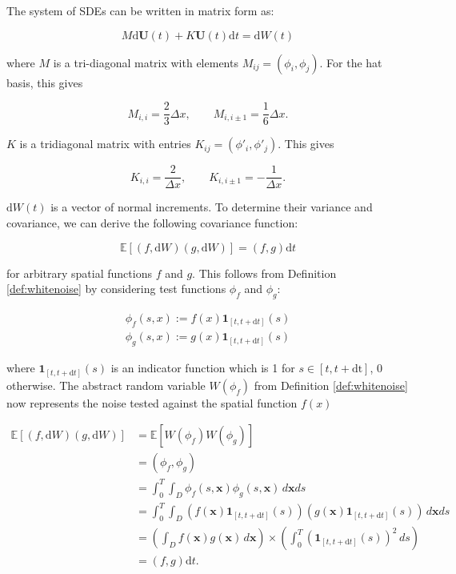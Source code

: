 The system of SDEs can be written in matrix form as:

\begin{equation}\label{eq:fe_sdes_system}
    M \mathrm{d}\mathbf{U}(t) + K \mathbf{U}(t)\mathrm{d}t = \mathrm{d}W(t)
\end{equation}

where $M$ is a tri-diagonal matrix with elements $M_{ij} = (\phi_i, \phi_j)$. 
For the hat basis, this gives

\begin{equation*}
    M_{i,i} = \frac{2}{3}\Delta x, \qquad M_{i, i\pm 1} = \frac{1}{6} \Delta x.
\end{equation*}

$K$ is a tridiagonal matrix with entries $K_{ij} =(\phi'_i, \phi'_j)$. This gives

\begin{equation*}
    K_{i,i} = \frac{2}{\Delta x}, \qquad K_{i, i\pm 1} = - \frac{1}{\Delta x}.
\end{equation*}

$\mathrm{d}W(t)$ is a vector of normal increments. To determine their variance and covariance, 
we can derive the following covariance function:

\begin{equation*}
    \mathbb{E}[(f, \mathrm{d}W)(g, \mathrm{d}W)] = (f,g) \mathrm{d}t
\end{equation*}

for arbitrary spatial functions $f$ and $g$. This follows from Definition \ref{def:whitenoise}
by considering test functions $\phi_f$ and $\phi_g$:

\begin{align*}
    \phi_f(s,x) := f(x)\mathbf{1}_{[t, t+\mathrm{d}t]}(s)\\
    \phi_g(s,x) := g(x)\mathbf{1}_{[t, t+\mathrm{d}t]}(s)
\end{align*}

where $\mathbf{1}_{[t, t+\mathrm{d}t]}(s)$ is an indicator function which is 1 for
$s \in [t, t + \mathrm{dt}]$, $0$ otherwise. The abstract random variable 
$W(\phi_f)$ from Definition \ref{def:whitenoise} now represents the noise tested 
against the spatial function $f(x)$


\begin{align*} 
    \mathbb{E}[(f, \mathrm{d}W)(g, \mathrm{d}W)] &= \mathbb{E}[W(\phi_f)W(\phi_g)] \\ 
    &= (\phi_f, \phi_g) \\ &= \int_0^T \int_D \phi_f(s, \mathbf{x}) \phi_g(s, \mathbf{x})
     \,d\mathbf{x}ds \\ &= \int_0^T \int_D \left( f(\mathbf{x}) \mathbf{1}_{[t, t+\mathrm{d}t]}(s) \right) 
     \left( g(\mathbf{x}) \mathbf{1}_{[t, t+\mathrm{d}t]}(s) \right) \,d\mathbf{x}ds \\
    &= \left( \int_D f(\mathbf{x})g(\mathbf{x})\,d\mathbf{x} \right)
     \times \left( \int_0^T (\mathbf{1}_{[t, t+\mathrm{d}t]}(s))^2 \,ds \right)  \\
    &= \left(f,g\right) \mathrm{d}t.
\end{align*} 

